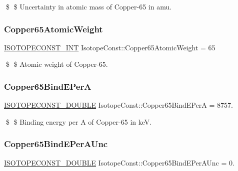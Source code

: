 \$ \$ Uncertainty in atomic mass of Copper-\/65 in amu. \mbox{\label{group___isotope_const-_copper-_cu65_gab8a97a7313f5ccb7137c4716821877f7}} 
\subsubsection{\texorpdfstring{Copper65\+Atomic\+Weight}{Copper65AtomicWeight}}
{\footnotesize\ttfamily \mbox{\hyperlink{group___isotope_const-_macros_ga5f18360b3e99483a35c32d789e62621c}{I\+S\+O\+T\+O\+P\+E\+C\+O\+N\+S\+T\+\_\+\+I\+NT}} Isotope\+Const\+::\+Copper65\+Atomic\+Weight = 65}

\$ \$ Atomic weight of Copper-\/65. \mbox{\label{group___isotope_const-_copper-_cu65_ga8aff13bcbe3025b6817814dd6f2ea591}} 
\subsubsection{\texorpdfstring{Copper65\+Bind\+E\+PerA}{Copper65BindEPerA}}
{\footnotesize\ttfamily \mbox{\hyperlink{group___isotope_const-_macros_ga8f45a7272ce02c0b4c65c44636ed719a}{I\+S\+O\+T\+O\+P\+E\+C\+O\+N\+S\+T\+\_\+\+D\+O\+U\+B\+LE}} Isotope\+Const\+::\+Copper65\+Bind\+E\+PerA = 8757.}

\$ \$ Binding energy per A of Copper-\/65 in keV. \mbox{\label{group___isotope_const-_copper-_cu65_ga029ac84a3de4e75cac61d2688385cf93}} 
\subsubsection{\texorpdfstring{Copper65\+Bind\+E\+Per\+A\+Unc}{Copper65BindEPerAUnc}}
{\footnotesize\ttfamily \mbox{\hyperlink{group___isotope_const-_macros_ga8f45a7272ce02c0b4c65c44636ed719a}{I\+S\+O\+T\+O\+P\+E\+C\+O\+N\+S\+T\+\_\+\+D\+O\+U\+B\+LE}} Isotope\+Const\+::\+Copper65\+Bind\+E\+Per\+A\+Unc = 0.}

